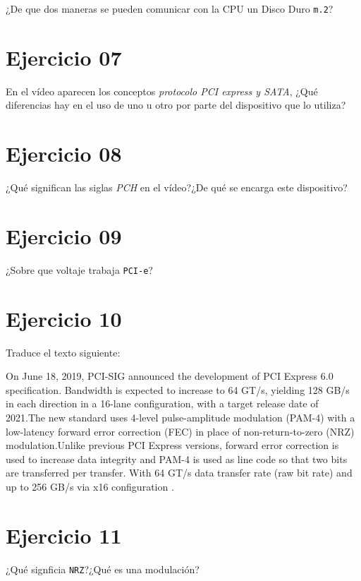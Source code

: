 \documentclass[11pt]{article}
\begin{document}
¿De que dos maneras se pueden comunicar con la CPU un Disco Duro \texttt{m.2}?

\section{Ejercicio 07}
\label{sec:org3dbf0bb}

En el vídeo aparecen los conceptos \emph{protocolo PCI express y SATA}, ¿Qué
diferencias hay en el uso de uno u otro por parte del dispositivo que lo
utiliza?

\section{Ejercicio 08}
\label{sec:org995bd0f}

¿Qué significan las siglas \emph{PCH} en el vídeo?¿De qué se encarga este
dispositivo?


\section{Ejercicio 09}
\label{sec:org134896c}

¿Sobre que voltaje trabaja \texttt{PCI-e}?

\section{Ejercicio 10}
\label{sec:org661eb4c}

Traduce el texto siguiente:

On June 18, 2019, PCI-SIG announced the development of PCI Express 6.0
specification. Bandwidth is expected to increase to 64 GT/s, yielding 128 GB/s
in each direction in a 16-lane configuration, with a target release date of
2021.The new standard uses 4-level pulse-amplitude modulation (PAM-4)
with a low-latency forward error correction (FEC) in place of
non-return-to-zero (NRZ) modulation.Unlike previous PCI Express versions,
forward error correction is used to increase data integrity and PAM-4 is used
as line code so that two bits are transferred per transfer. With 64 GT/s data
transfer rate (raw bit rate) and up to 256 GB/s via x16 configuration .


\section{Ejercicio 11}
\label{sec:org2c3163e}

¿Qué signficia \texttt{NRZ}?¿Qué es una modulación?
\end{document}
